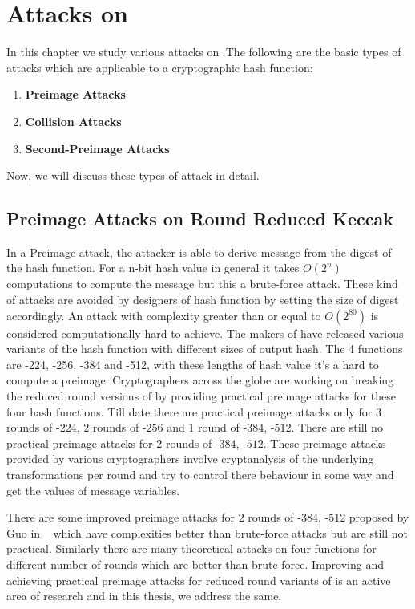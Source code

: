 \chapter{Attacks on \KECCAK{}}

In this chapter we study various attacks on \KECCAK{}.The following are the basic types of attacks which are applicable to a cryptographic hash function:

\begin{enumerate}
	\item \textbf{Preimage Attacks}
	\item \textbf{Collision Attacks}
	\item \textbf{Second-Preimage Attacks}
\end{enumerate}
Now, we will discuss these types of attack in detail.

\section{Preimage Attacks on Round Reduced Keccak}

In a Preimage attack, the attacker is able to derive message from the digest of the hash function. For a n-bit hash value in general it takes $O(2^{n})$ computations to compute the message but this a brute-force attack. These kind of attacks are avoided by designers of hash function by setting the size of digest accordingly. An attack with complexity greater than or equal to $O(2^{80})$ is considered computationally hard to achieve. The makers of \KECCAK{} have released various variants of the hash function  with different sizes of output hash. The 4  functions are -224, -256, -384 and -512, with these lengths of hash value it's a hard to compute a preimage. Cryptographers across the globe are working on breaking the reduced round versions of \KECCAK{} by providing practical preimage attacks for these four  hash functions. Till date there are practical preimage attacks only for $3$ rounds of \KECCAK-$224$, $2$ rounds of \KECCAK-$256$ and $1$ round of \KECCAK-$384$, \KECCAK-$512$. There are still no practical preimage attacks for $2$ rounds of \KECCAK-$384$, \KECCAK-$512$. These preimage attacks provided by various cryptographers involve cryptanalysis of the underlying transformations per round and try to control there behaviour in some way and get the values of message variables.

There are some improved preimage attacks for $2$ rounds of \KECCAK-$384$, \KECCAK-$512$ proposed by Guo \etal in ~\cite{guo2016linear} which have complexities better than brute-force attacks but are still not practical. Similarly there are many theoretical attacks on four  functions for different number of rounds which are better than brute-force. Improving and achieving practical preimage attacks for reduced round variants of \KECCAK{} is an active area of research and in this thesis, we address the same.

